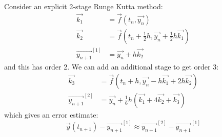 \documentclass[../Main.tex]{subfiles}
\begin{document}
\begin{example}
    Consider an explicit 2-stage Runge Kutta method:
    \begin{align*}
        \vec{k_1} &= \vec{f}(t_n, \vec{y_n}) \\
        \vec{k_2} &= \vec{f}(t_n + \frac12 h, \vec{y_n} + \frac12 h \vec{k_1}) \\
        \vec{y_{n+1}}^{[1]} &= \vec{y_n} + h \vec{k_2}
    \end{align*}
    and this has order 2. We can add an additional stage to get order 3:
    \begin{align*}
        \vec{k_3} &= \vec{f}(t_n + h, \vec{y_n} - h\vec{k_1} + 2h \vec{k_2}) \\
        \vec{y_{n+1}}^{[2]} &= \vec{y_n} + \frac16 h \left(\vec{k_1} + 4 \vec{k_2} + \vec{k_3}\right)
    \end{align*}
    which gives an error estimate:
    \begin{equation*}
        \vec{y}(t_{n+1}) - \vec{y_{n+1}}^{[1]} \approx \vec{y_{n+1}}^{[2]} - \vec{y_{n+1}}^{[1]}
    \end{equation*}
\end{example}
\end{document}
